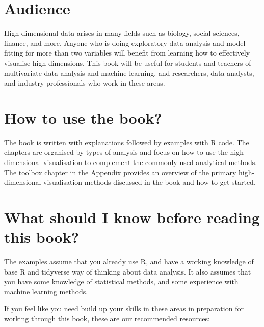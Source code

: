 \documentclass[
  letterpaper,
]{book}
\begin{document}
\hypertarget{audience}{%
\section*{Audience}\label{audience}}


High-dimensional data arises in many fields such as biology, social
sciences, finance, and more. Anyone who is doing exploratory data
analysis and model fitting for more than two variables will benefit from
learning how to effectively visualise high-dimensions. This book will be
useful for students and teachers of multivariate data analysis and
machine learning, and researchers, data analysts, and industry
professionals who work in these areas.

\hypertarget{how-to-use-the-book}{%
\section*{How to use the book?}\label{how-to-use-the-book}}


The book is written with explanations followed by examples with R code.
The chapters are organised by types of analysis and focus on how to use
the high-dimensional visualisation to complement the commonly used
analytical methods. The toolbox chapter in the Appendix provides an
overview of the primary high-dimensional visualisation methods discussed
in the book and how to get started.

\hypertarget{what-should-i-know-before-reading-this-book}{%
\section*{What should I know before reading this
book?}\label{what-should-i-know-before-reading-this-book}}


The examples assume that you already use R, and have a working knowledge
of base R and tidyverse way of thinking about data analysis. It also
assumes that you have some knowledge of statistical methods, and some
experience with machine learning methods.

If you feel like you need build up your skills in these areas in
preparation for working through this book, these are our recommended
resources:
\end{document}
